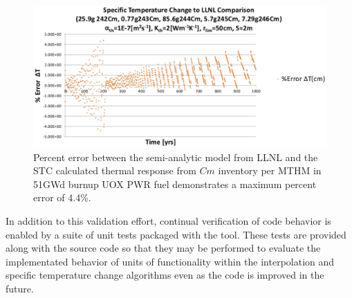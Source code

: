 \begin{figure}[htp!]
\begin{center}
\includegraphics[width=\columnwidth]{./chapters/methodology/thermal_models/CmPercentError.eps}
\end{center}
\caption{Percent error between the semi-analytic model from LLNL and the \gls{STC} 
calculated thermal response from $Cm$ inventory per MTHM in 51GWd burnup UOX 
PWR fuel demonstrates a maximum percent error of 4.4\%.}
\label{fig:CmPercentError}
\end{figure}
In addition to this validation effort, continual verification of code behavior 
is enabled by a suite of unit tests packaged with the tool. These tests are 
provided along with the source code so that they may be performed to evaluate 
the implementated behavior of units of functionality within the interpolation 
and specific temperature change algorithms even as the code is improved in the 
future.  
